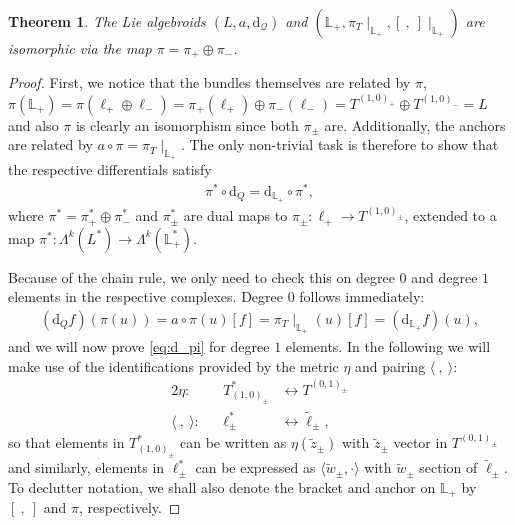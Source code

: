 \documentclass{article}
\newcommand{\QQ}{\mathcal{Q}}
\newcommand{\rd}{\mathrm{d}}
\newcommand{\Lb}{\mathbb{L}}
\newcommand{\ellt}{{\tl{\ell}}}
\newcommand{\la}{\langle}
\newcommand{\ra}{\rangle}
\newcommand{\lara}{\la\ ,\ \ra}
\newcommand{\brac}{[\ ,\ ]}
\def\tl{\tilde}
\newtheorem{theorem}{Theorem}[section]
\theoremstyle{definition}
\theoremstyle{definition}
\theoremstyle{remark}
\begin{document}
\begin{theorem}
The Lie algebroids $(L,a,\rd_\QQ)$ and $(\Lb_+,\pi_T\!\!\mid_{\Lb_+},\brac\!\!\mid_{\Lb_+})$ are isomorphic via the map $\pi=\pi_+\oplus \pi_-$.
\end{theorem}
\begin{proof}
First, we notice that the bundles themselves are related by $\pi$,  $\pi(\Lb_+)=\pi(\ell_+\oplus \ell_-)=\pi_+(\ell_+)\oplus \pi_-(\ell_-)=T^{(1,0)_+}\oplus T^{(1,0)_-}=L$ and also $\pi$ is clearly an isomorphism since both $\pi_\pm$ are. Additionally, the anchors are related by $a\circ\pi=\pi_T\!\!\mid_{\Lb_+}$. The only non-trivial task is therefore to show that the respective differentials satisfy
\begin{align}\label{eq:d_pi}
\pi^*\circ\rd_Q  =\rd_{\Lb_+}\circ \pi^*,
\end{align}
where $\pi^*=\pi^*_+\oplus\pi_-^*$ and $\pi^*_\pm$ are dual maps to $\pi_\pm:\ell_+\rightarrow T^{(1,0)_\pm}$, extended to a map $\pi^*:\Lambda^k(L^*)\rightarrow\Lambda^k(\Lb_+^*)$.

Because of the chain rule, we only need to check this on degree $0$ and degree $1$ elements in the respective complexes. Degree $0$ follows immediately:
\begin{align*}
(\rd_Q f)(\pi(u))= a\circ \pi(u)[f]=\pi_T\!\!\mid_{\Lb_+}(u)[f]=(\rd_{\Lb_+}f)(u),
\end{align*}
and we will now prove \ref{eq:d_pi} for degree $1$ elements. In the following we will make use of the identifications provided by the metric $\eta$ and pairing $\lara$:
\begin{alignat*}{2}
\eta:&& T^*_{(1,0)_\pm} &\leftrightarrow T^{(0,1)_\pm}\\
\lara:&& \ell^*_\pm &\leftrightarrow \ellt_\pm,
\end{alignat*}
so that elements in $T^*_{(1,0)_\pm}$ can be written as $\eta(\tl{z}_\pm)$ with $\tl{z}_\pm$ vector in $T^{(0,1)_\pm}$ and similarly, elements in $\ell^*_\pm$ can be expressed as $\la \tl{w}_\pm, \cdot\ra$ with $\tl{w}_\pm$ section of $\ellt_\pm$. To declutter notation, we shall also denote the bracket and anchor on $\Lb_+$ by $\brac$ and $\pi$, respectively.


\end{proof}
\end{document}
